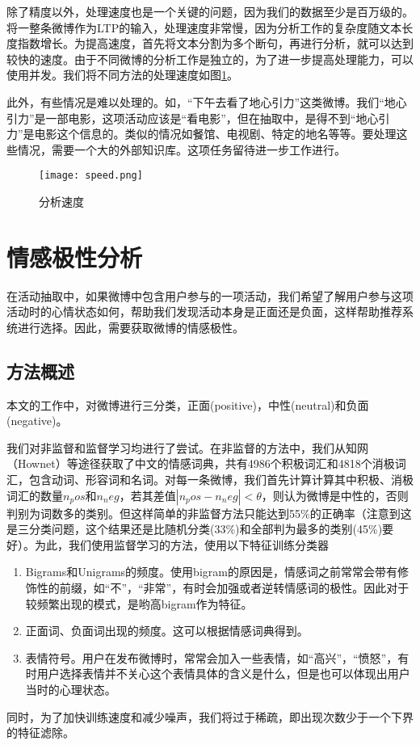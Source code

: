 除了精度以外，处理速度也是一个关键的问题，因为我们的数据至少是百万级的。将一整条微博作为LTP的输入，处理速度非常慢，因为分析工作的复杂度随文本长度指数增长。为提高速度，首先将文本分割为多个断句，再进行分析，就可以达到较快的速度。由于不同微博的分析工作是独立的，为了进一步提高处理能力，可以使用并发。我们将不同方法的处理速度如图\ref{fig:parse_speed}。

此外，有些情况是难以处理的。如，``下午去看了地心引力''这类微博。我们``地心引力''是一部电影，这项活动应该是``看电影''，但在抽取中，是得不到``地心引力''是电影这个信息的。类似的情况如餐馆、电视剧、特定的地名等等。要处理这些情况，需要一个大的外部知识库。这项任务留待进一步工作进行。

\begin{figure}[!h]
\centering
\texttt{[image: speed.png]}
\caption{分析速度}
\label{fig:parse_speed}
\end{figure}

\section{情感极性分析}
在活动抽取中，如果微博中包含用户参与的一项活动，我们希望了解用户参与这项活动时的心情状态如何，帮助我们发现活动本身是正面还是负面，这样帮助推荐系统进行选择。因此，需要获取微博的情感极性。

\subsection{方法概述}
本文的工作中，对微博进行三分类，正面(positive)，中性(neutral)和负面(negative)。

我们对非监督和监督学习均进行了尝试。在非监督的方法中，我们从知网（Hownet）等途径获取了中文的情感词典，共有4986个积极词汇和4818个消极词汇，包含动词、形容词和名词。对每一条微博，我们首先计算计算其中积极、消极词汇的数量$n_pos$和$n_neg$，若其差值$|n_pos-n_neg|<\theta$，则认为微博是中性的，否则判别为词数多的类别。但这样简单的非监督方法只能达到55\%的正确率（注意到这是三分类问题，这个结果还是比随机分类(33\%)和全部判为最多的类别(45\%)要好）。为此，我们使用监督学习的方法，使用以下特征训练分类器

\begin{enumerate}
\item Bigrams和Unigrams的频度。使用bigram的原因是，情感词之前常常会带有修饰性的前缀，如``不''，``非常''，有时会加强或者逆转情感词的极性。因此对于较频繁出现的模式，是哟高bigram作为特征。
\item 正面词、负面词出现的频度。这可以根据情感词典得到。
\item 表情符号。用户在发布微博时，常常会加入一些表情，如``高兴''，``愤怒''，有时用户选择表情并不关心这个表情具体的含义是什么，但是也可以体现出用户当时的心理状态。
\end{enumerate}
同时，为了加快训练速度和减少噪声，我们将过于稀疏，即出现次数少于一个下界的特征滤除。

